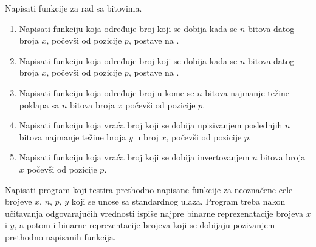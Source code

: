 \begin{Exercise}[label=1_08]
Napisati funkcije za rad sa bitovima. 
\begin{enumerate}
\item Napisati funkciju  koja određuje broj koji se dobija kada se $n$ bitova datog broja $x$, počevši od pozicije $p$, postave na .
\item Napisati funkciju  koja određuje broj koji se dobija kada se $n$ bitova datog broja $x$, počevši od pozicije $p$, postave na .
\item %
Napisati funkciju  koja određuje broj u kome se $n$ bitova najmanje težine poklapa sa $n$ bitova broja $x$ počevši od pozicije $p$.
\item %
Napisati funkciju  koja vraća broj koji se dobija upisivanjem poslednjih $n$ bitova najmanje težine broja $y$ u broj $x$, počevši od pozicije $p$.
\item Napisati funkciju  koja vraća broj koji se dobija invertovanjem $n$ bitova broja $x$ počevši od pozicije $p$. 
\end{enumerate}
Napisati program koji testira prethodno napisane funkcije za neoznačene cele brojeve $x$, $n$, $p$, $y$ koji se unose sa standardnog ulaza. Program treba nakon učitavanja odgovarajućih vrednosti ispiše najpre binarne reprezenatacije brojeva $x$ i $y$, a potom i binarne reprezentacije brojeva koji se dobijaju pozivanjem prethodno napisanih funkcija.


\end{Exercise}
